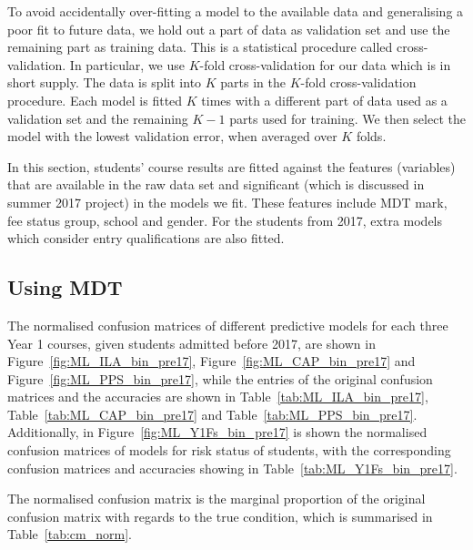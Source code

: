 \documentclass[a4paper]{report}
\begin{document}
To avoid accidentally over-fitting a model to the available data and generalising a poor fit to future data, we hold out a part of data as validation set and use the remaining part as training data. This is a statistical procedure called cross-validation. In particular, we use $K$-fold cross-validation for our data which is in short supply. The data is split into $K$ parts in the $K$-fold cross-validation procedure. Each model is fitted $K$ times with a different part of data used as a validation set and the remaining $K-1$ parts used for training. We then select the model with the lowest validation error, when averaged over $K$ folds. 

In this section, students' course results are fitted against the features (variables) that are available in the raw data set and significant (which is discussed in summer 2017 project) in the models we fit. These features include MDT mark, fee status group, school and gender. For the students from 2017, extra models which consider entry qualifications are also fitted. 

\subsection{Using MDT}

The normalised confusion matrices of different predictive models for each three Year 1 courses, given students admitted before 2017, are shown in Figure~\ref{fig:ML_ILA_bin_pre17}, Figure~\ref{fig:ML_CAP_bin_pre17} and Figure~\ref{fig:ML_PPS_bin_pre17}, while the entries of the original confusion matrices and the accuracies are shown in Table~\ref{tab:ML_ILA_bin_pre17}, Table~\ref{tab:ML_CAP_bin_pre17} and Table~\ref{tab:ML_PPS_bin_pre17}. Additionally, in Figure~\ref{fig:ML_Y1Fs_bin_pre17} is shown the normalised confusion matrices of models for risk status of students, with the corresponding confusion matrices and accuracies showing in Table~\ref{tab:ML_Y1Fs_bin_pre17}. 

The normalised confusion matrix is the marginal proportion of the original confusion matrix with regards to the true condition, which is summarised in Table~\ref{tab:cm_norm}. 
\end{document}
